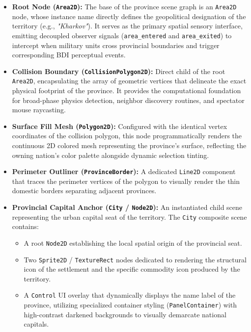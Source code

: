 \begin{itemize}
    \item \textbf{Root Node (\texttt{Area2D}):} The base of the province scene graph is an \texttt{Area2D} node, whose instance name directly defines the geopolitical designation of the territory (e.g., \textit{"Kharkov"}). It serves as the primary spatial sensory interface, emitting decoupled observer signals (\texttt{area\_entered} and \texttt{area\_exited}) to intercept when military units cross provincial boundaries and trigger corresponding BDI perceptual events.
    \item \textbf{Collision Boundary (\texttt{CollisionPolygon2D}):} Direct child of the root \texttt{Area2D}, encapsulating the array of geometric vertices that delineate the exact physical footprint of the province. It provides the computational foundation for broad-phase physics detection, neighbor discovery routines, and spectator mouse raycasting.
    \item \textbf{Surface Fill Mesh (\texttt{Polygon2D}):} Configured with the identical vertex coordinates of the collision polygon, this node programmatically renders the continuous 2D colored mesh representing the province's surface, reflecting the owning nation's color palette alongside dynamic selection tinting.
    \item \textbf{Perimeter Outliner (\texttt{ProvinceBorder}):} A dedicated \texttt{Line2D} component that traces the perimeter vertices of the polygon to visually render the thin domestic borders separating adjacent provinces.
    \item \textbf{Provincial Capital Anchor (\texttt{City} / \texttt{Node2D}):} An instantiated child scene representing the urban capital seat of the territory. The \texttt{City} composite scene contains:
    \begin{itemize}
        \item A root \texttt{Node2D} establishing the local spatial origin of the provincial seat.
        \item Two \texttt{Sprite2D} / \texttt{TextureRect} nodes dedicated to rendering the structural icon of the settlement and the specific commodity icon produced by the territory.
        \item A \texttt{Control} UI overlay that dynamically displays the name label of the province, utilizing specialized container styling (\texttt{PanelContainer}) with high-contrast darkened backgrounds to visually demarcate national capitals.
    \end{itemize}

\end{itemize}
